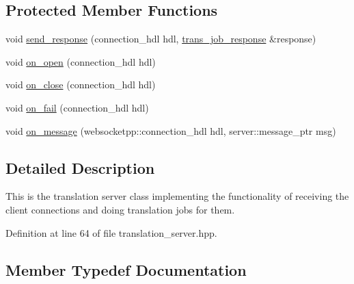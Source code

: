 \subsection*{Protected Member Functions}
\begin{DoxyCompactItemize}
\item 
void \hyperlink{classuva_1_1smt_1_1bpbd_1_1server_1_1translation__server_a57a29ff74e1ed45b04ad70eca4cb81dd}{send\+\_\+response} (connection\+\_\+hdl hdl, \hyperlink{classuva_1_1smt_1_1bpbd_1_1common_1_1messaging_1_1trans__job__response}{trans\+\_\+job\+\_\+response} \&response)
\item 
void \hyperlink{classuva_1_1smt_1_1bpbd_1_1server_1_1translation__server_aba474a4a531b53d047d0325c0547090a}{on\+\_\+open} (connection\+\_\+hdl hdl)
\item 
void \hyperlink{classuva_1_1smt_1_1bpbd_1_1server_1_1translation__server_ac458534555d855f68799ca675f612bc5}{on\+\_\+close} (connection\+\_\+hdl hdl)
\item 
void \hyperlink{classuva_1_1smt_1_1bpbd_1_1server_1_1translation__server_ac26c124f12bc61c9a989e1c899b010ca}{on\+\_\+fail} (connection\+\_\+hdl hdl)
\item 
void \hyperlink{classuva_1_1smt_1_1bpbd_1_1server_1_1translation__server_ac3def6980110c67b945d2483a2734630}{on\+\_\+message} (websocketpp\+::connection\+\_\+hdl hdl, server\+::message\+\_\+ptr msg)
\end{DoxyCompactItemize}


\subsection{Detailed Description}
This is the translation server class implementing the functionality of receiving the client connections and doing translation jobs for them. 

Definition at line 64 of file translation\+\_\+server.\+hpp.



\subsection{Member Typedef Documentation}
\hypertarget{classuva_1_1smt_1_1bpbd_1_1server_1_1translation__server_a7a3d55d39330bc8414d5c0964c8e5bd7}{}
